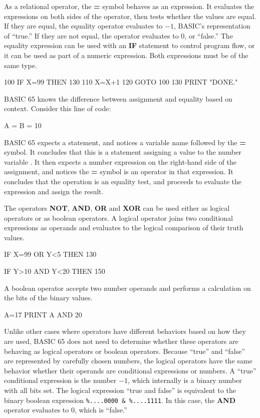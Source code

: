 As a relational operator, the {\bf =} symbol behaves as an expression.
It evaluates the expressions on both sides of the operator, then tests whether
the values are equal. If they are equal, the equality operator evaluates to
$-1$, BASIC's representation of ``true.'' If they are not equal, the operator
evaluates to 0, or ``false.'' The equality expression can be used with an {\bf
IF} statement to control program flow, or it can be used as part of a numeric
expression. Both expressions must be of the same type.

\begin{screencode}
100 IF X=99 THEN 130
110 X=X+1
120 GOTO 100
130 PRINT "DONE."
\end{screencode}

BASIC 65 knows the difference between assignment and equality based on
context. Consider this line of code:

\begin{screencode}
A = B = 10
\end{screencode}

BASIC 65 expects a statement, and notices a variable name followed by the
{\bf =} symbol. It concludes that this is a statement assigning a value
to the number variable . It then expects a number expression on
the right-hand side of the assignment, and notices the {\bf =} symbol
is an operator in that expression. It concludes that the operation is an
equality test, and proceeds to evaluate the expression and assign the result.

The operators {\bf NOT}, {\bf AND}, {\bf OR} and {\bf XOR} can be used either
as logical operators or as boolean operators. A logical operator joins two
conditional expressions as operands and evaluates to the logical comparison of
their truth values.

\begin{screencode}
IF X=99 OR Y<5 THEN 130

IF Y>10 AND Y<20 THEN 150
\end{screencode}

A boolean operator accepts two number operands and performs a calculation on
the bits of the binary values.

\begin{screencode}
A=17
PRINT A AND 20
\end{screencode}

Unlike other cases where operators have different behaviors based on how they
are used, BASIC 65 does not need to determine whether these operators are
behaving as logical operators or boolean operators. Because ``true'' and
``false'' are represented by carefully chosen numbers, the logical operators
have the same behavior whether their operands are conditional expressions or
numbers. A ``true'' conditional expression is the number $-1$, which
internally is a binary number with all bits set. The logical expression ``true
and false'' is equivalent to the binary boolean expression {\tt \%....0000 \&
\%....1111}. In this case, the {\bf AND} operator evaluates to 0, which is
``false.''

